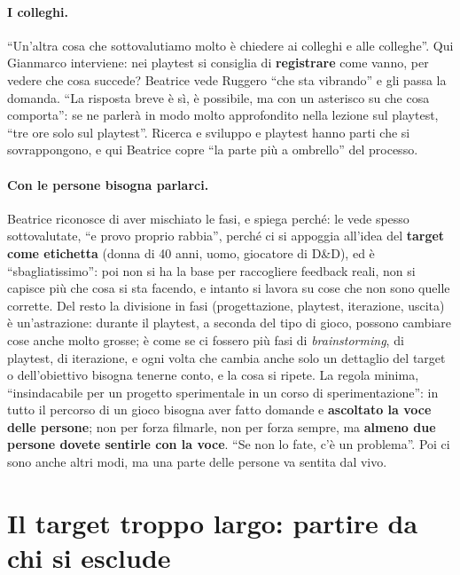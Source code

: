 \paragraph{I colleghi.} ``Un'altra cosa che sottovalutiamo molto è chiedere ai
colleghi e alle colleghe''. Qui Gianmarco interviene: nei playtest si consiglia di
\textbf{registrare} come vanno, per vedere che cosa succede? Beatrice vede Ruggero
``che sta vibrando'' e gli passa la domanda. ``La risposta breve è sì, è possibile, ma
con un asterisco su che cosa comporta'': se ne parlerà in modo molto approfondito
nella lezione sul playtest, ``tre ore solo sul playtest''. Ricerca e sviluppo e
playtest hanno parti che si sovrappongono, e qui Beatrice copre ``la parte più a
ombrello'' del processo.

\paragraph{Con le persone bisogna parlarci.} Beatrice riconosce di aver mischiato
le fasi, e spiega perché: le vede spesso sottovalutate, ``e provo proprio rabbia'',
perché ci si appoggia all'idea del \textbf{target come etichetta} (donna di 40 anni,
uomo, giocatore di D\&D), ed è ``sbagliatissimo'': poi non si ha la base per
raccogliere feedback reali, non si capisce più che cosa si sta facendo, e intanto si
lavora su cose che non sono quelle corrette. Del resto la divisione in fasi
(progettazione, playtest, iterazione, uscita) è un'astrazione: durante il playtest,
a seconda del tipo di gioco, possono cambiare cose anche molto grosse; è come se ci
fossero più fasi di \emph{brainstorming}, di playtest, di iterazione, e ogni volta che
cambia anche solo un dettaglio del target o dell'obiettivo bisogna tenerne conto, e la
cosa si ripete. La regola minima, ``insindacabile per un progetto sperimentale in un
corso di sperimentazione'': in tutto il percorso di un gioco bisogna aver fatto
domande e \textbf{ascoltato la voce delle persone}; non per forza filmarle, non per
forza sempre, ma \textbf{almeno due persone dovete sentirle con la voce}. ``Se non lo
fate, c'è un problema''. Poi ci sono anche altri modi, ma una parte delle persone va
sentita dal vivo.

\section{Il target troppo largo: partire da chi si esclude}
\label{a6:sec:nicchia}

